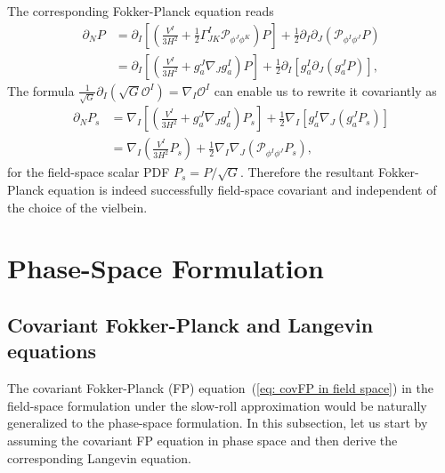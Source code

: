 \documentclass[aps, prd
, preprint
, nofootinbib 
, notitlepage
, longbibliography
]{revtex4-1}
\newcommand{\calO}{\mathcal{O}}
\newcommand{\calP}{\mathcal{P}}
\newcommand{\bae}[1]{\begin{align} #1 \end{align}}
\begin{document}
The corresponding Fokker-Planck equation reads
\bae{
    \partial_NP&=\partial_I\left[\left(\frac{V^I}{3H^2}+\frac{1}{2}\Gamma^I_{JK}\calP_{\phi^J\phi^K}\right)P\right]+\frac{1}{2}\partial_I\partial_J(\calP_{\phi^I\phi^J}P) \nonumber \\
    &=\partial_I\left[\left(\frac{V^I}{3H^2}+g_a^J\nabla_Jg^I_a\right)P\right]+\frac{1}{2}\partial_I\left[g^I_a\partial_J(g^J_aP)\right],
}
The formula $\frac{1}{\sqrt{G}}\partial_I(\sqrt{G}\calO^I)=\nabla_I\calO^I$ can enable us to rewrite it covariantly as
\bae{\label{eq: covFP in field space}
    \partial_NP_s&=\nabla_I\left[\left(\frac{V^I}{3H^2}+g^J_a\nabla_Jg^I_a\right)P_s\right]+\frac{1}{2}\nabla_I\left[g^I_a\nabla_J(g^J_aP_s)\right] \nonumber \\
    &=\nabla_I\left(\frac{V^I}{3H^2}P_s\right)+\frac{1}{2}\nabla_I\nabla_J(\calP_{\phi^I\phi^J}P_s),
}
for the field-space scalar PDF $P_s=P/\sqrt{G}$. Therefore the resultant Fokker-Planck equation is indeed 
successfully field-space covariant and independent of the choice of the vielbein.




\section{Phase-Space Formulation}

\subsection{Covariant Fokker-Planck and Langevin equations}

The covariant Fokker-Planck (FP) equation~(\ref{eq: covFP in field space}) in the field-space formulation under the slow-roll approximation
would be naturally generalized to the phase-space formulation.
In this subsection, let us start by assuming the covariant FP equation in phase space and then derive the corresponding Langevin equation.
\end{document}
